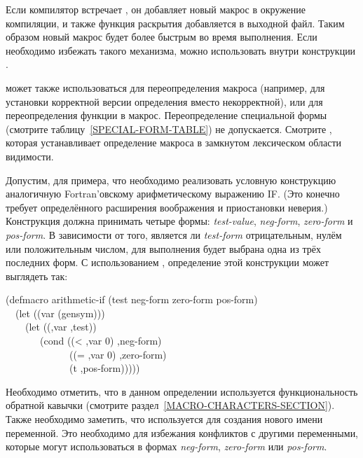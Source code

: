 \begin{defmac}
Если компилятор встречает , он добавляет новый макрос в окружение
компиляции, и также функция раскрытия добавляется в выходной файл. Таким образом
новый макрос будет более быстрым во время выполнения.
Если необходимо избежать такого механизма, можно использовать 
внутри конструкции .

 может также использоваться для переопределения макроса
(например, для установки корректной версии определения вместо некорректной), или
для переопределения функции в макрос.
Переопределение специальной формы (смотрите таблицу~\ref{SPECIAL-FORM-TABLE})
не допускается.
Смотрите , которая устанавливает определение макроса в замкнутом
лексическом области видимости.

Допустим, для примера, что необходимо реализовать условную конструкцию
аналогичную Fortran'овскому арифметическому выражению IF. (Это конечно требует
определённого расширения воображения и приостановки неверия.)
Конструкция должна принимать четыре формы:
\emph{test-value},
\emph{neg-form},
\emph{zero-form} и
\emph{pos-form}.
В зависимости от того, является ли \emph{test-form} отрицательным, нулём или
положительным числом, для выполнения будет выбрана одна из трёх последних форм.
С использованием , определение этой конструкции может выглядеть
так:
\begin{lisp}
(defmacro arithmetic-if (test neg-form zero-form pos-form) \\
~~(let ((var (gensym))) \\
~~~~{\Xbq}(let ((,var ,test)) \\
~~~~~~~(cond ((< ,var 0) ,neg-form) \\
~~~~~~~~~~~~~((= ,var 0) ,zero-form) \\
~~~~~~~~~~~~~(t ,pos-form)))))
\end{lisp}
Необходимо отметить, что в данном определении используется функциональность
обратной кавычки (смотрите раздел~\ref{MACRO-CHARACTERS-SECTION}).
Также необходимо заметить, что используется  для создания нового
имени переменной.
Это необходимо для избежания конфликтов с другими переменными, которые могут
использоваться в формах \emph{neg-form}, \emph{zero-form} или \emph{pos-form}.


\end{defmac}
